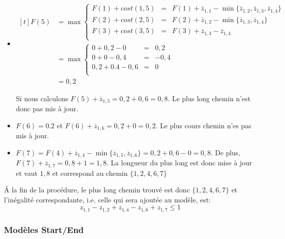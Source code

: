 \begin{ex}
\begin{itemize}
\item $\begin{aligned}[t] 
    F(5) &=  \max \left\{
        \begin{array}{lcl}
          F(1) + cost (1,5) & = & F(1) + \overline{z}_{1,1}  -
                                  \min\{\overline{z}_{1,2},\overline{z}_{1,3},\overline{z}_{1,4}\} 
          \\ 
          F(2) + cost (2,5) &= & F(2) + \overline{z}_{1,2} -
                             \min\{\overline{z}_{1,3}, \overline{z}_{1,4}\}\\
          F(3) + cost (3,5) &= & F(3) + \overline{z}_{1,3} -
                             \overline{z}_{1,4} \\
        \end{array} \right.\\
      &=  \max \left\{ 
        \begin{array}{lcl}
          0 + 0,2 - 0 &=& 0,2 \\
          0 + 0 - 0,4 &= &-0,4 \\
          0,2 + 0.4 - 0,6 &= & 0 \\ 
        \end{array} \right.\\
    &=  0,2
  \end{aligned}$

  Si nous calculons $F(5)+\overline{z}_{1,5}=0,2+0,6=0,8$. Le plus
  long chemin n'est donc pas mis à jour. 

\item $F(6)= 0.2$ et $F(6)+\overline{z}_{1,6}=0,2+0=0,2$. Le plus cours 
  chemin n'es pas mis à jour. 
\item $F(7) = F(4) +\overline{z}_{1,4} -
  \min\{\overline{z}_{1,5},\overline{z}_{1,6}\}= 0,2 + 0,6 - 0 =
  0,8$. De plus, $F(7)+\overline{z}_{1,7}=0,8+1=1,8$. La longueur du
  plus long est donc mise à jour et vaut $1,8$ et correspond au chemin $\{1,2,4,6,7\}$
\end{itemize}

{\'A} la fin de la procédure, le plus long chemin trouvé est donc
$\{1,2,4,6,7\}$ et l'inégalité correspondante, i.e. celle qui sera
ajoutée au modèle, est:
\[  z_{1,1} - z_{1,2} + z_{1,4} - z_{1,6} + z_{1,7} \le 1  \]
\end{ex}  

\subsubsection{Modèles Start/End}



